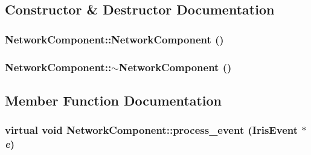 \begin{CompactItemize}
\subsection{Constructor \& Destructor Documentation}
\hypertarget{classNetworkComponent_fbc5367d657f132a271f4e48c1523790}{
\subsubsection[{NetworkComponent}]{\setlength{\rightskip}{0pt plus 5cm}NetworkComponent::NetworkComponent ()}}
\label{classNetworkComponent_fbc5367d657f132a271f4e48c1523790}


\hypertarget{classNetworkComponent_05adbdf1cb3611bbfd937887065d3feb}{
\subsubsection[{$\sim$NetworkComponent}]{\setlength{\rightskip}{0pt plus 5cm}NetworkComponent::$\sim$NetworkComponent ()}}
\label{classNetworkComponent_05adbdf1cb3611bbfd937887065d3feb}




\subsection{Member Function Documentation}
\hypertarget{classNetworkComponent_c93793eea1e2d424abe86e110ca8b399}{
\subsubsection[{process\_\-event}]{\setlength{\rightskip}{0pt plus 5cm}virtual void NetworkComponent::process\_\-event ({\bf IrisEvent} $\ast$ {\em e})}}
\label{classNetworkComponent_c93793eea1e2d424abe86e110ca8b399}





\end{CompactItemize}
